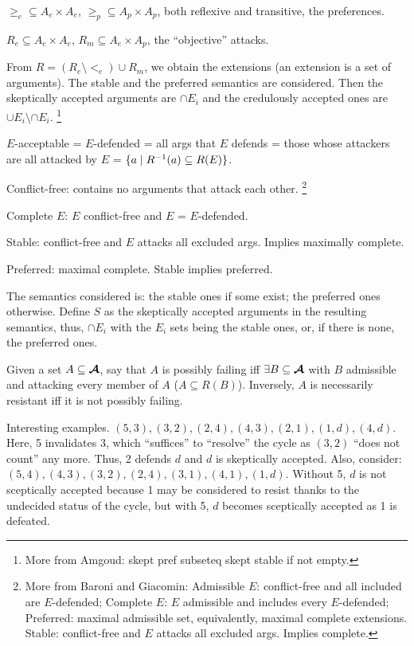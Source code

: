 \documentclass[version=3.21, pagesize, twoside=off, bibliography=totoc, DIV=calc, fontsize=12pt, a4paper, french, english]{scrartcl}
\begin{document}
${≥_e} \subseteq A_e × A_e$, ${≥_p} \subseteq A_p × A_p$, both reflexive and transitive, the preferences.

$R_e \subseteq A_e × A_e$, $R_m \subseteq A_e × A_p$, the “objective” attacks. 

From $R = (R_e \setminus {<_e}) \cup R_m$, we obtain the extensions (an extension is a set of arguments). The stable and the preferred semantics are considered. Then the skeptically accepted arguments are $\cap E_i$ and the credulously accepted ones are $\cup E_i \setminus \cap E_i$.
\footnote{More from Amgoud: skept pref subseteq skept stable if not empty.}

$E$-acceptable = $E$-defended = all args that $E$ defends = those whose attackers are all attacked by $E$ = $\set{a \suchthat R^{-1}(a)\subseteq R(E)}$.

Conflict-free: contains no arguments that attack each other.
\footnote{More from Baroni and Giacomin: Admissible $E$: conflict-free and all included are $E$-defended; Complete $E$: $E$ admissible and includes every $E$-defended; Preferred: maximal admissible set, equivalently, maximal complete extensions. Stable: conflict-free and $E$ attacks all excluded args. Implies complete.}

Complete $E$: $E$ conflict-free and $E$ = $E$-defended.

Stable: conflict-free and $E$ attacks all excluded args. Implies maximally complete.

Preferred: maximal complete. Stable implies preferred. 

The semantics considered is: the stable ones if some exist; the preferred ones otherwise. Define $S$ as the skeptically accepted arguments in the resulting semantics, thus, $\cap E_i$ with the $E_i$ sets being the stable ones, or, if there is none, the preferred ones.

Given a set $A \subseteq \bm{\mathcal{A}}$, say that $A$ is possibly failing iff $\exists B \subseteq \bm{\mathcal{A}}$ with $B$ admissible and attacking every member of $A$ ($A \subseteq R(B)$).
Inversely, $A$ is necessarily resistant iff it is not possibly failing.

Interesting examples. $(5, 3), (3, 2), (2, 4), (4, 3), (2, 1), (1, d), (4, d)$. Here, 5 invalidates 3, which “suffices” to “resolve” the cycle as $(3, 2)$ “does not count” any more. Thus, 2 defends $d$ and $d$ is skeptically accepted. Also, consider: $(5, 4), (4, 3), (3, 2), (2, 4), (3, 1), (4, 1), (1, d)$. Without 5, $d$ is not sceptically accepted because 1 may be considered to resist thanks to the undecided status of the cycle, but with 5, $d$ becomes sceptically accepted as 1 is defeated.
\end{document}
